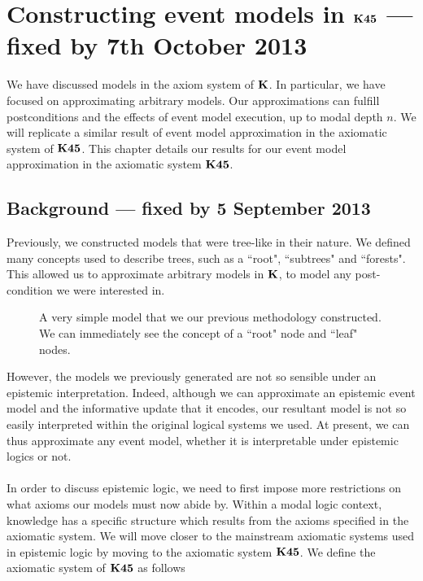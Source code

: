 \section{Constructing event models in $\bf K45$ --- fixed by 7th October 2013}

We have discussed models in the axiom system of $\bf K$.
In particular, we have focused on approximating arbitrary models.
Our approximations can fulfill postconditions and the effects of event model execution, up to modal
depth $n$.
We will replicate a similar result of event model approximation in the axiomatic system
of $\bf K45$.
This chapter details our results for our event model approximation in the axiomatic system
$\bf K45$.

\subsection{Background --- fixed by 5 September 2013}

Previously, we constructed models that were tree-like in their nature.
We defined many concepts used to describe trees, such as a ``root", ``subtrees" and ``forests".
This allowed us to approximate arbitrary models in $\bf K$, to model any post-condition we
were interested in.

\begin{figure}[ht!]
\centering
{}
\caption{A very simple model that we our previous methodology constructed.
We can immediately see the concept of a ``root" node and ``leaf" nodes.}
\label{exampleModel}
\end{figure}

However, the models we previously generated are not so sensible under an epistemic interpretation.
Indeed, although we can approximate an epistemic event model and the informative update that it
encodes, our resultant model is not so easily interpreted within the original logical systems we
used.
At present, we can thus approximate any event model, whether it is interpretable under epistemic
logics or not.\\
\\
In order to discuss epistemic logic, we need to first impose more restrictions on what axioms our
models must now abide by.
Within a modal logic context, knowledge has a specific structure which results from the axioms
specified in the axiomatic system.
We will move closer to the mainstream axiomatic systems used in epistemic logic by moving to the
axiomatic system $\bf K45$.
We define the axiomatic system of $\bf K45$ as follows

